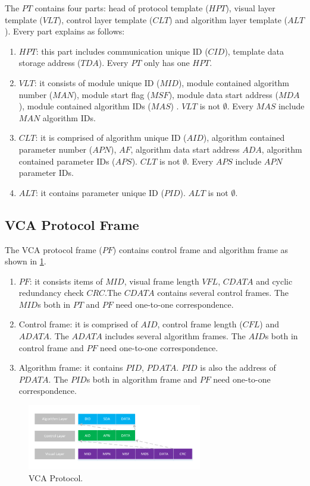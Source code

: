 \documentclass[journal,UTF8]{IEEEtran}
\begin{document}
 The $PT$ contains four parts: head of protocol template ($HPT$), visual layer template ($VLT$), control layer template ($CLT$) and algorithm layer template ($ALT$). Every part explains as follows: 
 \begin{enumerate}
 	\item $HPT$: this part includes communication unique ID ($CID$), template data storage address ($TDA$). Every $PT$ only has one $HPT$.
 	\item $VLT$: it consists of module unique ID ($MID$), module contained algorithm number ($MAN$), module start flag ($MSF$), module data start address ($MDA$), module contained algorithm IDs ($MAS$) . $VLT$ is not $\emptyset$. Every $MAS$ include $MAN$ algorithm IDs. 
 	\item $CLT$: it is comprised of algorithm unique ID ($AID$), algorithm contained parameter number ($APN$), $AF$, algorithm data start address $ADA$, algorithm contained parameter IDs ($APS$). $CLT$ is not $\emptyset$. Every $APS$ include $APN$ parameter IDs.
 	\item $ALT$: it contains parameter unique ID ($PID$). $ALT$ is not $\emptyset$. 
 \end{enumerate}
 \subsection{VCA Protocol Frame}
 The VCA protocol frame ($PF$) contains control frame and algorithm frame as shown in \ref{fig:Protocol}. 

 \begin{enumerate}
	\item $PF$: it consists items of $MID$, visual frame length $VFL$, $CDATA$ and cyclic redundancy check $CRC$.The $CDATA$ contains several control frames. The $MID$s both in $PT$ and $PF$ need one-to-one correspondence.
	\item Control frame: it is comprised of $AID$, control frame length ($CFL$) and $ADATA$.
	The $ADATA$ includes several algorithm frames. The $AID$s both in control frame and $PF$ need one-to-one correspondence.
	\item Algorithm frame: it contains $PID$, $PDATA$. $PID$ is also the address of $PDATA$. The $PID$s both in algorithm frame and $PF$ need one-to-one correspondence.
\end{enumerate}


\begin{figure}
	\centering
	\includegraphics[width=3in]{fig/Protocol.pdf}
	\caption{ VCA Protocol.}
	\label{fig:Protocol}
\end{figure}
\end{document}
